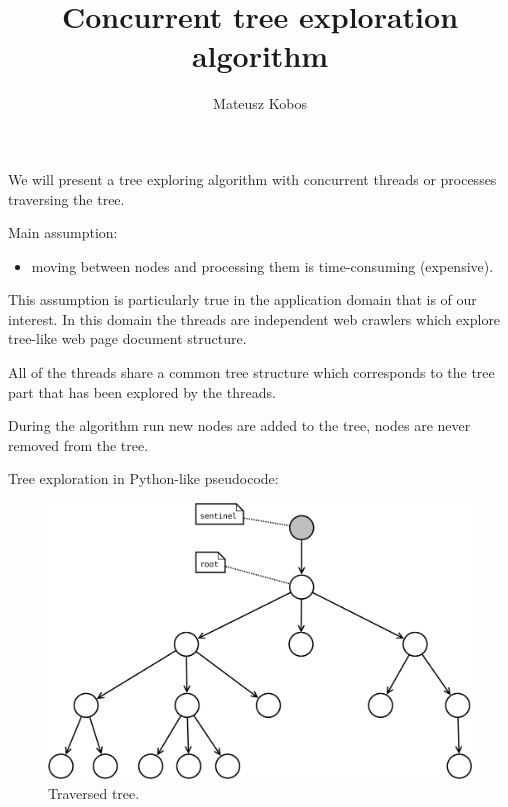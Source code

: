 \documentclass[12pt]{article}
\title{Concurrent tree exploration algorithm}
\author{Mateusz Kobos}
\begin{document}
\maketitle

We will present a tree exploring algorithm with concurrent threads or processes traversing the tree.

Main assumption:
\begin{itemize}
	\item moving between nodes and processing them is time-consuming (expensive).
\end{itemize}

This assumption is particularly true in the application domain that is of our interest. In this domain the threads are independent web crawlers which explore tree-like web page document structure.

All of the threads share a common tree structure which corresponds to the tree part that has been explored by the threads.

During the algorithm run new nodes are added to the tree, nodes are never removed from the tree.

Tree exploration in Python-like pseudocode:

\lstset{language=Python}


\begin{figure}[!ht]
	\centering
		\includegraphics[scale=0.35]{pics/tree.pdf}
	\caption{Traversed tree.}
	\label{fig:tree}
\end{figure}
\end{document}
